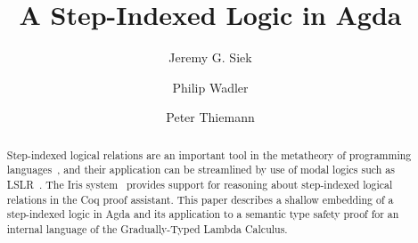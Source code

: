 \documentclass[acmsmall]{acmart}
\begin{document}
\title{A Step-Indexed Logic in Agda}

\author{Jeremy G. Siek}

\author{Philip Wadler}

\author{Peter Thiemann}


\begin{abstract}
  Step-indexed logical relations are an important tool in the
  metatheory of programming
  languages~\citep{Appel:2001aa,Ahmed:2006aa}, and their application
  can be streamlined by use of modal logics such as
  LSLR~\citep{Dreyer:2011wl}.  The Iris system~\citep{JUNG:2018aa}
  provides support for reasoning about step-indexed logical relations
  in the Coq proof assistant. This paper describes a shallow embedding
  of a step-indexed logic in Agda and its application to a semantic
  type safety proof for an internal language of the Gradually-Typed
  Lambda Calculus.
\end{abstract}


\end{document}
